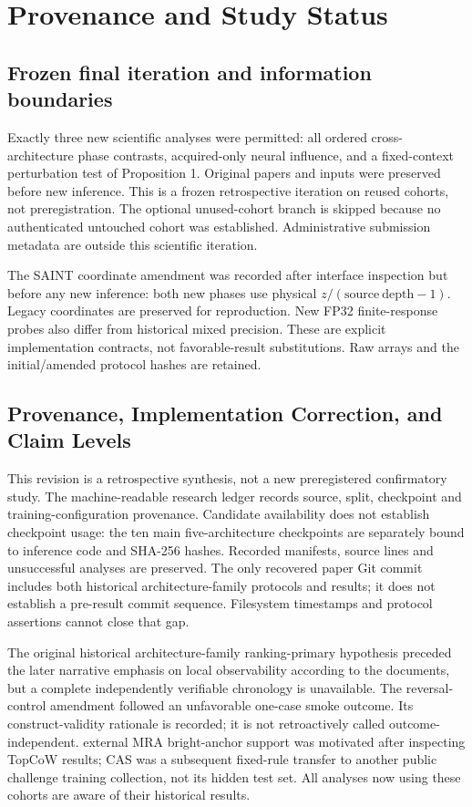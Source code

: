 \section{Provenance and Study Status}
\subsection{Frozen final iteration and information boundaries}
Exactly three new scientific analyses were permitted: all ordered cross-architecture phase contrasts, acquired-only neural influence, and a fixed-context perturbation test of Proposition 1. Original papers and inputs were preserved before new inference. This is a frozen retrospective iteration on reused cohorts, not preregistration. The optional unused-cohort branch is skipped because no authenticated untouched cohort was established. Administrative submission metadata are outside this scientific iteration.

The SAINT coordinate amendment was recorded after interface inspection but before any new inference: both new phases use physical $z/(\mathrm{source\ depth}-1)$. Legacy coordinates are preserved for reproduction. New FP32 finite-response probes also differ from historical mixed precision. These are explicit implementation contracts, not favorable-result substitutions. Raw arrays and the initial/amended protocol hashes are retained.

\subsection{Provenance, Implementation Correction, and Claim Levels}
This revision is a retrospective synthesis, not a new preregistered confirmatory study. The machine-readable research ledger records source, split, checkpoint and training-configuration provenance. Candidate availability does not establish checkpoint usage: the ten main five-architecture checkpoints are separately bound to inference code and SHA-256 hashes. Recorded manifests, source lines and unsuccessful analyses are preserved. The only recovered paper Git commit includes both historical architecture-family protocols and results; it does not establish a pre-result commit sequence. Filesystem timestamps and protocol assertions cannot close that gap.

The original historical architecture-family ranking-primary hypothesis preceded the later narrative emphasis on local observability according to the documents, but a complete independently verifiable chronology is unavailable. The reversal-control amendment followed an unfavorable one-case smoke outcome. Its construct-validity rationale is recorded; it is not retroactively called outcome-independent. external MRA bright-anchor support was motivated after inspecting TopCoW results; CAS was a subsequent fixed-rule transfer to another public challenge training collection, not its hidden test set. All analyses now using these cohorts are aware of their historical results.

